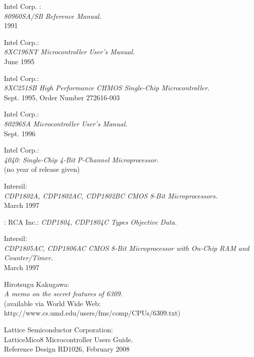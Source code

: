  Intel Corp. : \\
                 {\em 80960SA/SB Reference Manual.\/} \\
                 1991

 Intel Corp.: \\
                 {\em 8XC196NT Microcontroller User's Manual.\/} \\
                 June 1995

 Intel Corp.: \\
                 {\em 8XC251SB High Performance CHMOS Single-Chip
                  Microcontroller.\/} \\
                 Sept. 1995, Order Number 272616-003

 Intel Corp.: \\
                 {\em 80296SA Microcontroller User's Manual.\/} \\
                 Sept. 1996

 Intel Corp.: \\
                  {\em 4040: Single-Chip 4-Bit P-Channel
                   Microprocessor.\/} \\
                  (no year of release given)

 Intersil: \\
                 {\em CDP1802A, CDP1802AC, CDP1802BC CMOS 8-Bit
                  Microprocessors.\/} \\
                 March 1997

: RCA Inc.:
                 {\em CDP1804, CDP1804C Types Objective Data.}

 Intersil: \\
                 {\em CDP1805AC, CDP1806AC CMOS 8-Bit Microprocessor
                  with On-Chip RAM and Counter/Timer.\/} \\
                 March 1997

 Hirotsugu Kakugawa: \\
               {\em A memo on the secret features of 6309.\/} \\
    	       (available via World Wide Web: \\
      	       http://www.cs.umd.edu/users/fms/comp/CPUs/6309.txt)

 Lattice Semiconductor Corporation: \\
                   {LatticeMico8 Microcontroller Users Guide.\/} \\
                   Reference Design RD1026, February 2008

